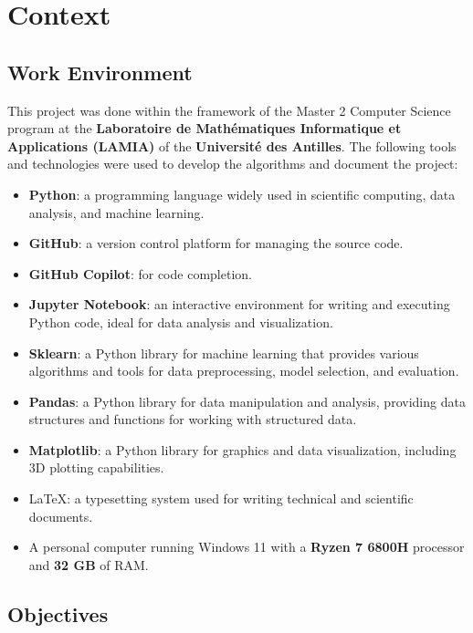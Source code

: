 \chapter{Context}
\label{chap:context}



\section{Work Environment}
\label{sec:work_environment}

This project was done within the framework of the Master 2 Computer Science program at the
\textbf{Laboratoire de Mathématiques Informatique et Applications (LAMIA)} of the \textbf{Université des Antilles}.
The following tools and technologies were used to develop the algorithms and document the project:

\begin{itemize}
	\item \textbf{Python}: a programming language widely used in scientific computing, data analysis, and machine learning.
	\item \textbf{GitHub}: a version control platform for managing the source code.
	\item \textbf{GitHub Copilot}: for code completion.
	\item \textbf{Jupyter Notebook}: an interactive environment for writing and executing Python code, ideal for data analysis and
	      visualization.
	\item \textbf{Sklearn}: a Python library for machine learning that provides various algorithms and tools for data preprocessing,
	      model selection, and evaluation.
	\item \textbf{Pandas}: a Python library for data manipulation and analysis, providing data structures and functions for working with
	      structured data.
	\item \textbf{Matplotlib}: a Python library for graphics and data visualization, including 3D plotting capabilities.
	\item \LaTeX : a typesetting system used for writing technical and scientific documents.
	\item A personal computer running Windows 11 with a \textbf{Ryzen 7 6800H} processor and \textbf{32 GB} of RAM.
\end{itemize}

\section{Objectives}
\label{sec:objectives}


